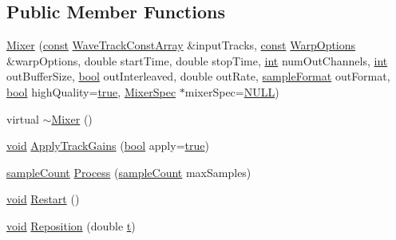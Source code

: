 \subsection*{Public Member Functions}
\begin{DoxyCompactItemize}
\item 
\hyperlink{class_mixer_a14a889e4735eb41df9233bb5b8940118}{Mixer} (\hyperlink{getopt1_8c_a2c212835823e3c54a8ab6d95c652660e}{const} \hyperlink{class_wave_track_const_array}{Wave\+Track\+Const\+Array} \&input\+Tracks, \hyperlink{getopt1_8c_a2c212835823e3c54a8ab6d95c652660e}{const} \hyperlink{class_mixer_1_1_warp_options}{Warp\+Options} \&warp\+Options, double start\+Time, double stop\+Time, \hyperlink{xmltok_8h_a5a0d4a5641ce434f1d23533f2b2e6653}{int} num\+Out\+Channels, \hyperlink{xmltok_8h_a5a0d4a5641ce434f1d23533f2b2e6653}{int} out\+Buffer\+Size, \hyperlink{mac_2config_2i386_2lib-src_2libsoxr_2soxr-config_8h_abb452686968e48b67397da5f97445f5b}{bool} out\+Interleaved, double out\+Rate, \hyperlink{include_2audacity_2_types_8h_a9938d2e2f6adef23e745cd80ef379792}{sample\+Format} out\+Format, \hyperlink{mac_2config_2i386_2lib-src_2libsoxr_2soxr-config_8h_abb452686968e48b67397da5f97445f5b}{bool} high\+Quality=\hyperlink{mac_2config_2i386_2lib-src_2libsoxr_2soxr-config_8h_a41f9c5fb8b08eb5dc3edce4dcb37fee7}{true}, \hyperlink{class_mixer_spec}{Mixer\+Spec} $\ast$mixer\+Spec=\hyperlink{px__mixer_8h_a070d2ce7b6bb7e5c05602aa8c308d0c4}{N\+U\+LL})
\item 
virtual \hyperlink{class_mixer_a85026e8a94b704a13e65445b80fc7821}{$\sim$\+Mixer} ()
\item 
\hyperlink{sound_8c_ae35f5844602719cf66324f4de2a658b3}{void} \hyperlink{class_mixer_af8bae2c2e3856622c27a9e0bbdaa91d2}{Apply\+Track\+Gains} (\hyperlink{mac_2config_2i386_2lib-src_2libsoxr_2soxr-config_8h_abb452686968e48b67397da5f97445f5b}{bool} apply=\hyperlink{mac_2config_2i386_2lib-src_2libsoxr_2soxr-config_8h_a41f9c5fb8b08eb5dc3edce4dcb37fee7}{true})
\item 
\hyperlink{include_2audacity_2_types_8h_afa427e1f521ea5ec12d054e8bd4d0f71}{sample\+Count} \hyperlink{class_mixer_a40cfca0f1d5015c23a2af2dbb15e69ed}{Process} (\hyperlink{include_2audacity_2_types_8h_afa427e1f521ea5ec12d054e8bd4d0f71}{sample\+Count} max\+Samples)
\item 
\hyperlink{sound_8c_ae35f5844602719cf66324f4de2a658b3}{void} \hyperlink{class_mixer_a9de8a837717e6dce430e05cde2b694a1}{Restart} ()
\item 
\hyperlink{sound_8c_ae35f5844602719cf66324f4de2a658b3}{void} \hyperlink{class_mixer_ab05c2944ec11fff0fbdbe6d79dfb4c3c}{Reposition} (double \hyperlink{octave__test_8m_aaccc9105df5383111407fd5b41255e23}{t})

\end{DoxyCompactItemize}
